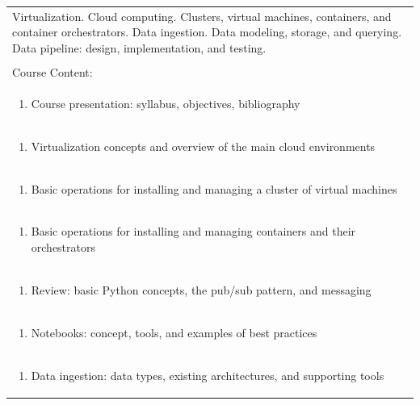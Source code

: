 \documentclass[11pt]{article}
\begin{document}
\begin{center}
\begin{longtable}{|p{4cm}|p{4cm}|p{4cm}|p{4cm}|}
\multicolumn{4}{|p{\dimexpr 16cm + 6\tabcolsep\relax}|}{Virtualization. Cloud computing. Clusters, virtual machines, containers, and container orchestrators. Data ingestion. Data modeling, storage, and querying. Data pipeline: design, implementation, and testing.}\\
\multicolumn{4}{|p{16cm}|}{}\\
\hline
\multicolumn{4}{|p{16cm}|}{Course Content:}\\*
\multicolumn{4}{|p{\dimexpr 16cm + 6\tabcolsep\relax}|}{\begin{enumerate}[start=1]\item Course presentation: syllabus, objectives, bibliography\end{enumerate}}\\
\multicolumn{4}{|p{\dimexpr 16cm + 6\tabcolsep\relax}|}{\begin{enumerate}[start=2]\item Virtualization concepts and overview of the main cloud environments\end{enumerate}}\\
\multicolumn{4}{|p{\dimexpr 16cm + 6\tabcolsep\relax}|}{\begin{enumerate}[start=3]\item Basic operations for installing and managing a cluster of virtual machines\end{enumerate}}\\
\multicolumn{4}{|p{\dimexpr 16cm + 6\tabcolsep\relax}|}{\begin{enumerate}[start=4]\item Basic operations for installing and managing containers and their orchestrators\end{enumerate}}\\
\multicolumn{4}{|p{\dimexpr 16cm + 6\tabcolsep\relax}|}{\begin{enumerate}[start=5]\item Review: basic Python concepts, the pub/sub pattern, and messaging\end{enumerate}}\\
\multicolumn{4}{|p{\dimexpr 16cm + 6\tabcolsep\relax}|}{\begin{enumerate}[start=6]\item Notebooks: concept, tools, and examples of best practices\end{enumerate}}\\
\multicolumn{4}{|p{\dimexpr 16cm + 6\tabcolsep\relax}|}{\begin{enumerate}[start=7]\item Data ingestion: data types, existing architectures, and supporting tools\end{enumerate}}\\

\end{longtable}
\end{center}
\end{document}
